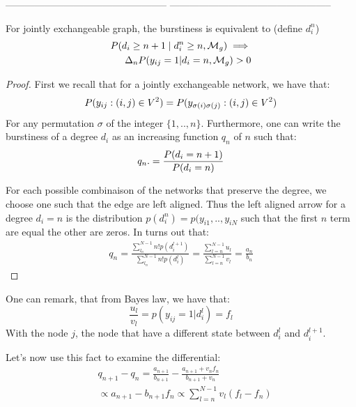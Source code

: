 --------------------------------------------------
--------------------------------------------------

\begin{theorem}
	For jointly exchangeable graph, the burstiness is equivalent to (define $d_i^n$)
	\begin{align}
	P(d_{i} \ge n+1 \mid d_i^n \ge n, \mathcal{M}_g) \implies \\  \Delta_n P(y_{ij}=1 | d_i=n, \mathcal{M}_g) > 0
	\end{align}
\end{theorem}

\begin{proof}
	First we recall that for a jointly exchangeable network, we have that:
	\begin{equation}
	P(y_{ij}: (i,j) \in V^2) = P(y_{\sigma(i)\sigma(j)}: (i,j) \in V^2)
	\end{equation}
	For any permutation $\sigma$ of the integer $\{1,..,n\}$. Furthermore, one can write the burstiness of a degree $d_i$ as an increasing function $q_n$ of $n$ such that:
	\begin{equation}
	q_n. = \frac{P(d_i=n+1)}{P(d_i=n)}
	\end{equation}
	
	For each possible combinaison of the networks that preserve the degree, we choose one such that the edge are left aligned. Thus the left aligned arrow for a degree $d_i=n$ is the distribution $p(d_i^n)=p(y_{i1},..,y_{iN}$ such that the first $n$ term are equal the other are zeros. In turns out that:
	\begin{align}
	q_n = \frac{\sum_{l_n}^{N-1} n! p(d_i^{l+1})}{\sum_{l_n}^{N-1} n! p(d_i^{l})} = \frac{\sum_{l=n}^{N-1} u_l}{\sum_{l=n}^{N-1} v_l} = \frac{a_n}{b_n}
	\end{align}
\end{proof}

One can remark, that from Bayes law, we have that:
\begin{equation}
\frac{u_l}{v_l} = p(y_{ij}=1 | d_i^l) = f_l
\end{equation}
With the node $j$, the node that have a different state between $d_i^l$ and $d_i^{l+1}$.

Let's now use this fact to examine  the differential:
\begin{align*}
&q_{n+1} - q_n = \frac{a_{n+1}}{b_{n+1}} - \frac{a_{n+1}+v_n f_n}{b_{n+1}+v_n} \\ 
&\propto a_{n+1} - b_{n+1} f_n \propto \sum_{l=n}^{N-1} v_l (f_l - f_n)
\end{align*}

